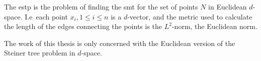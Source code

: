 The \gls{estp} is the problem of finding the \gls{smt} for the set of points $N$
in Euclidean $d$-space. I.e\ each point $x_{i}, 1 \le i \le n$ is a $d$-vector,
and the metric used to calculate the length of the edges connecting the points
is the $L^2$-norm, the Euclidean norm.

The work of this thesis is only concerned with the Euclidean version of the
Steiner tree problem in $d$-space.

\chapterbreak{}


